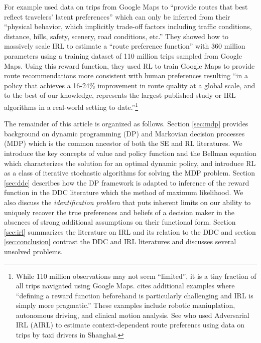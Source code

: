 For example \citet{barnes:2024} used data on trips from Google Maps to ``provide routes that best reflect
travelers' latent preferences'' which can only be inferred from their ``physical behavior, which implicitly
trade-off factors including traffic conditions, distance, hills, safety, scenery, road conditions, etc.'' They showed
how to massively scale IRL to estimate a ``route preference function'' with 360 million parameters using  
a training dataset of 110 million trips sampled from Google Maps.  Using this reward function, they 
used  RL to train Google Maps to provide  route recommendations more consistent with
human preferences resulting ``in a policy that achieves a 16-24\% improvement
in route quality at a global scale, and to the best of our knowledge, represents the largest published study or IRL
algorithms in a real-world setting to date.''\footnote{\footnotesize While 110 million observations may not seem
``limited'', it is a tiny fraction of all trips navigated using Google Maps. \citet{Jeon:2021} cites
additional examples where ``defining a reward function beforehand is particularly challenging and IRL is simply
more pragmatic.'' These examples include robotic maniuplation, autonomous driving, and clinical motion analysis.
See \citet{zhao:2023} who used Adversarial IRL (AIRL) to estimate context-dependent
route preferencs using data on trips by taxi drivers in Shanghai.} 

The remainder of this article is organized as follows. Section \ref{sec:mdp} provides background on dynamic programming
(DP) and Markovian decision processes (MDP) which is the common ancestor of both the SE and RL literatures. We introduce
the key concepts of value and policy function and the Bellman equation which characterizes the solution for an
optimal dynamic policy, and introduce RL as a class of iterative stochastic algorithms for solving the MDP problem. 
Section \ref{sec:ddc} describes how the DP framework is adapted to inference of the
reward function in the DDC literature which the method of maximum likelihood. We also discuss the
{\it identification problem\/} that puts inherent limits on our ability to uniquely recover the true preferences
 and beliefs of a decision maker in the absences of strong additional assumptions on their functional form.
Section \ref{sec:irl} summarizes the literature on IRL and its relation to the DDC and section \ref{sec:conclusion} 
contrast the DDC and IRL literatures and discusses several unsolved problems.


